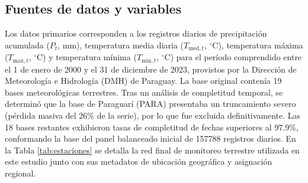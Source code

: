 \documentclass[11pt,a4paper]{article}
\begin{document}
\subsection{Fuentes de datos y variables}
Los datos primarios corresponden a los registros diarios de precipitación acumulada ($P_t$, mm), temperatura media diaria ($T_{\mathrm{med},t}$, $^\circ$C), temperatura máxima ($T_{\mathrm{max},t}$, $^\circ$C) y temperatura mínima ($T_{\mathrm{min},t}$, $^\circ$C) para el período comprendido entre el 1 de enero de 2000 y el 31 de diciembre de 2023, provistos por la Dirección de Meteorología e Hidrología (DMH) de Paraguay. La base original contenía 19 bases meteorológicas terrestres. Tras un análisis de completitud temporal, se determinó que la base de Paraguarí (PARA) presentaba un truncamiento severo (pérdida masiva del 26\% de la serie), por lo que fue excluida definitivamente. Las 18 bases restantes exhibieron tasas de completitud de fechas superiores al 97.9\%, conformando la base del panel balanceado inicial de 157788 registros diarios. En la Tabla \ref{tab:estaciones} se detalla la red final de monitoreo terrestre utilizada en este estudio junto con sus metadatos de ubicación geográfica y asignación regional.
\end{document}
